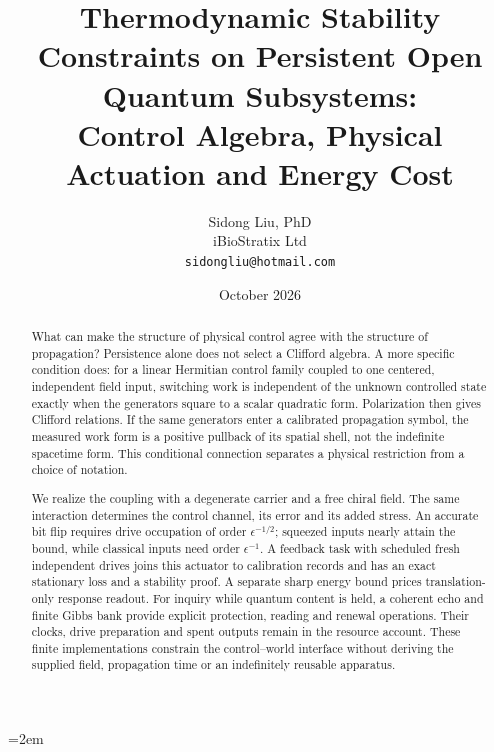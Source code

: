 \documentclass[aps,pre,onecolumn,superscriptaddress,floatfix,longbibliography]{revtex4-2}
\begin{document}
\emergencystretch=2em
\raggedbottom

\title{Thermodynamic Stability Constraints on Persistent Open Quantum Subsystems:\texorpdfstring{\\}{ }
Control Algebra, Physical Actuation and Energy Cost}

\author{Sidong Liu, PhD \\
\small iBioStratix Ltd \\
\small \texttt{sidongliu@hotmail.com}}

\date{October 2026}

\begin{abstract}
What can make the structure of physical control agree with the structure of propagation? Persistence alone does not select a Clifford algebra. A more specific condition does: for a linear Hermitian control family coupled to one centered, independent field input, switching work is independent of the unknown controlled state exactly when the generators square to a scalar quadratic form. Polarization then gives Clifford relations. If the same generators enter a calibrated propagation symbol, the measured work form is a positive pullback of its spatial shell, not the indefinite spacetime form. This conditional connection separates a physical restriction from a choice of notation.

We realize the coupling with a degenerate carrier and a free chiral field. The same interaction determines the control channel, its error and its added stress. An accurate bit flip requires drive occupation of order $\epsilon^{-1/2}$; squeezed inputs nearly attain the bound, while classical inputs need order $\epsilon^{-1}$. A feedback task with scheduled fresh independent drives joins this actuator to calibration records and has an exact stationary loss and a stability proof. A separate sharp energy bound prices translation-only response readout. For inquiry while quantum content is held, a coherent echo and finite Gibbs bank provide explicit protection, reading and renewal operations. Their clocks, drive preparation and spent outputs remain in the resource account. These finite implementations constrain the control--world interface without deriving the supplied field, propagation time or an indefinitely reusable apparatus.
\end{abstract}

\maketitle
\end{document}

